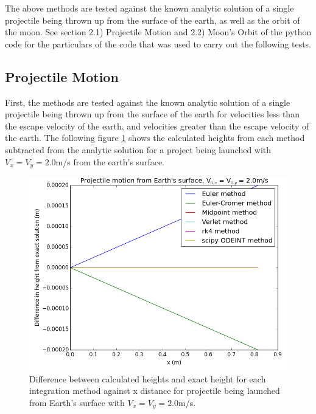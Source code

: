 \documentclass[10pt,letterpaper]{article}
\begin{document}
The above methods are tested against the known analytic solution of a single projectile being thrown up from the surface of the earth, as well as the orbit of the moon. See section 2.1) Projectile Motion and 2.2) Moon's Orbit of the python code for the particulars of the code that was used to carry out the following tests.\\

\subsection{Projectile Motion}

First, the methods are tested against the known analytic solution of a single projectile being thrown up from the surface of the earth for velocities less than the escape velocity of the earth, and velocities greater than the escape velocity of the earth. The following figure \ref{fig:projectile_motion_difference_from_exact_all_methods} shows the calculated heights from each method subtracted from the analytic solution for a project being launched with $V_x = V_y = 2.0$m/s from the earth's surface.\\

\begin{figure}[!htb]
\centering
\includegraphics[scale=0.6]{figures/test_cases/projectile_motion_difference_from_exact_all_methods.png}
\caption{Difference between calculated heights and exact height for each integration method against x distance for projectile being launched from Earth's surface with $V_x = V_y = 2.0$m/s.}\label{fig:projectile_motion_difference_from_exact_all_methods}
\end{figure}
\end{document}

